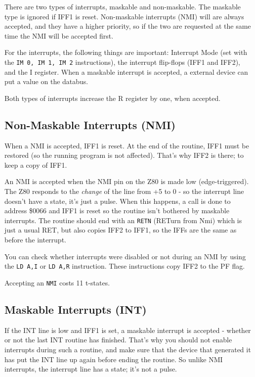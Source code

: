 \documentclass[12pt,twoside,openright,a4paper]{book}
\begin{document}
There are two types of interrupts, maskable and non-maskable. The maskable type is ignored if IFF1 is reset. Non-maskable interrupts (NMI) will are always accepted, and they have a higher priority, so if the two are requested at the same time the NMI will be accepted first.

For the interrupts, the following things are important: Interrupt Mode (set with the {\tt IM 0, IM 1, IM 2} instructions), the interrupt flip-flops (IFF1 and IFF2), and the I register. When a maskable interrupt is accepted, a external device can put a value on the databus.

Both types of interrupts increase the R register by one, when accepted.


\subsection{Non-Maskable Interrupts (NMI)}

When a NMI is accepted, IFF1 is reset. At the end of the routine, IFF1 must be restored (so the running program is not affected). That's why IFF2 is there; to keep a copy of IFF1.

An NMI is accepted when the NMI pin on the Z80 is made low (edge-triggered). The Z80 responds to the {\em change} of the line from +5 to 0 - so the interrupt line doesn't have a state, it's just a pulse. When this happens, a call is done to address \$0066 and IFF1 is reset so the routine isn't bothered by maskable interrupts. The routine should end with an {\tt RETN} (RETurn from Nmi) which is just a usual RET, but also copies IFF2 to IFF1, so the IFFs are the same as before the interrupt.

You can check whether interrupts were disabled or not during an NMI by using the {\tt LD A,I} or {\tt LD A,R} instruction. These instructions copy IFF2 to the PF flag.

Accepting an {\tt NMI} costs 11 t-states.


\subsection{Maskable Interrupts (INT)}

If the INT line is low and IFF1 is set, a maskable interrupt is accepted - whether or not the last INT routine has finished. That's why you should not enable interrupts during such a routine, and make sure that the device that generated it has put the INT line up again before ending the routine. So unlike NMI interrupts, the interrupt line has a state; it's not a pulse.
\end{document}
